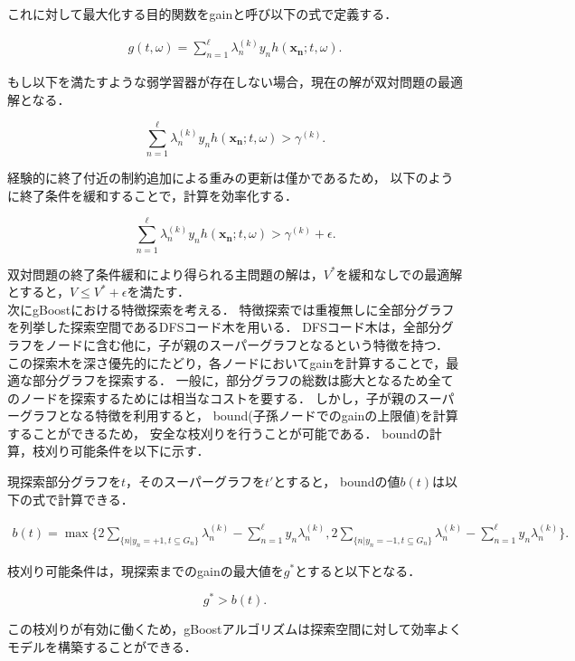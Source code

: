 これに対して最大化する目的関数をgainと呼び以下の式で定義する．

\begin{align}
	\label{eq:gain}
	g(t, \omega) = \sum_{n=1}^{\ell} \lambda_{n}^{(k)} y_{n} h(\bm{x_{n}} ; t, \omega).
\end{align}

もし以下を満たすような弱学習器が存在しない場合，現在の解が双対問題の最適解となる．

\begin{equation*}
	\sum_{n=1}^{\ell} \lambda_{n}^{(k)} y_{n} h(\bm{x_{n}} ; t, \omega) > \gamma^{(k)}.
\end{equation*}

経験的に終了付近の制約追加による重みの更新は僅かであるため，
以下のように終了条件を緩和することで，計算を効率化する．

\begin{equation*}
	\sum_{n=1}^{\ell} \lambda_{n}^{(k)} y_{n} h(\bm{x_{n}} ; t, \omega) > \gamma^{(k)} + \epsilon .
\end{equation*}

双対問題の終了条件緩和により得られる主問題の解は，$V^*$を緩和なしでの最適解とすると，$V \leq V^* + \epsilon$を満たす．\\

次にgBoostにおける特徴探索を考える．
特徴探索では重複無しに全部分グラフを列挙した探索空間であるDFSコード木\cite{gSpan}を用いる．
DFSコード木は，全部分グラフをノードに含む他に，子が親のスーパーグラフとなるという特徴を持つ．
この探索木を深さ優先的にたどり，各ノードにおいてgainを計算することで，最適な部分グラフを探索する．
一般に，部分グラフの総数は膨大となるため全てのノードを探索するためには相当なコストを要する．
しかし，子が親のスーパーグラフとなる特徴を利用すると，
bound(子孫ノードでのgainの上限値)を計算することができるため，
安全な枝刈りを行うことが可能である．
boundの計算，枝刈り可能条件を以下に示す．

現探索部分グラフを$t$，そのスーパーグラフを$t'$とすると，
boundの値$b(t)$は以下の式で計算できる．

\begin{align}
	b(t) = \max\{2 \sum_{\{n|y_{n}=+1, t \subseteq G_{n}\}} \lambda_{n}^{(k)} - \sum_{n=1}^{\ell} y_{n} \lambda_{n}^{(k)},	2 \sum_{\{n|y_{n}=-1, t \subseteq G_{n}\}} \lambda_{n}^{(k)} - \sum_{n=1}^{\ell} y_{n} \lambda_{n}^{(k)}\}.
	\label{eq:bound}
\end{align}

枝刈り可能条件は，現探索までのgainの最大値を$g^{*}$とすると以下となる．

\begin{equation*}
	g^{*} > b(t).
\end{equation*}

この枝刈りが有効に働くため，gBoostアルゴリズムは探索空間に対して効率よくモデルを構築することができる．
